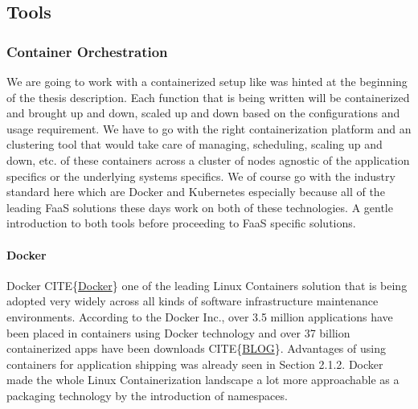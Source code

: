 \documentclass[12pt,titlepage]{article}
\begin{document}
\subsection{Tools}
\label{sec:org7525c73}
\subsubsection{Container Orchestration}
\label{sec:orgb2a5885}
We are going to work with a containerized setup like was hinted at the beginning
of the thesis description. Each function that is being written will be
containerized and brought up and down, scaled up and down based on the
configurations and usage requirement. We have to go with the right
containerization platform and an clustering tool that would take care of
managing, scheduling, scaling up and down, etc. of these containers across a
cluster of nodes agnostic of the application specifics or the underlying systems
specifics. We of course go with the industry standard here which are Docker and
Kubernetes especially because all of the leading FaaS solutions these days work
on both of these technologies. A gentle introduction to both tools before
proceeding to FaaS specific solutions.
\paragraph{Docker}
\label{sec:orgcb887c3}
Docker CITE\{\href{https://www.docker.com/}{Docker}\} one of the leading Linux Containers solution that is being
adopted very widely across all kinds of software infrastructure maintenance
environments. According to the Docker Inc., over 3.5 million applications have
been placed in containers using Docker technology and over 37 billion
containerized apps have been downloads CITE\{\href{https://www.zdnet.com/article/what-is-docker-and-why-is-it-so-darn-popular/}{BLOG}\}. Advantages of using
containers for application shipping was already seen in Section 2.1.2. Docker
made the whole Linux Containerization landscape a lot more approachable as a
packaging technology by the introduction of namespaces.
\end{document}
